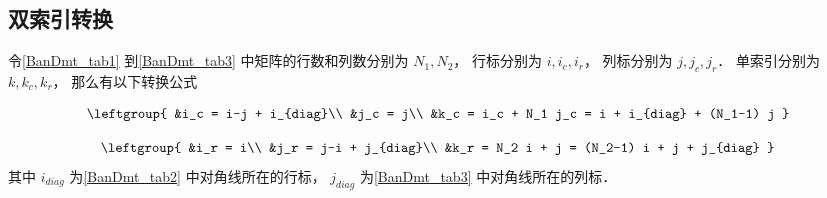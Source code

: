 \subsection{双索引转换}

令\autoref{BanDmt_tab1} 到\autoref{BanDmt_tab3} 中矩阵的行数和列数分别为 $N_1, N_2$， 行标分别为 $i, i_c, i_r$， 列标分别为 $j, j_c, j_r$． 单索引分别为 $k, k_c, k_r$， 那么有以下转换公式

\begin{equation}
\leftgroup{
&i_c = i-j + i_{diag}\\
&j_c = j\\
&k_c = i_c + N_1 j_c = i + i_{diag} + (N_1-1) j
}\end{equation}

\begin{equation}
\leftgroup{
&i_r = i\\
&j_r = j-i + j_{diag}\\
&k_r = N_2 i + j = (N_2-1) i + j + j_{diag}
}\end{equation}
其中 $i_{diag}$ 为\autoref{BanDmt_tab2} 中对角线所在的行标， $j_{diag}$ 为\autoref{BanDmt_tab3} 中对角线所在的列标．

